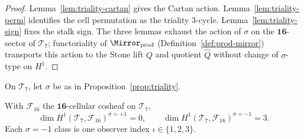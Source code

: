 \begin{proof}
Lemma~\ref{lem:triality-cartan} gives the Cartan action.
Lemma~\ref{lem:triality-perm} identifies the cell permutation as the triality
$3$-cycle. Lemma~\ref{lem:triality-sign} fixes the stalk sign.
The three lemmas exhaust the action of $\sigma$ on the
$\mathbf{16}$-sector of $\mathcal{T}_7$; functoriality of
$\Mirror_{\mathrm{prod}}$ (Definition~\ref{def:prod-mirror}) transports this
action to the Stone lift $Q$ and quotient $\hat Q$ without change of
$\sigma$-type on $H^1$.
\end{proof}

On $\mathcal{T}_7$, let $\sigma$ be as in Proposition~\ref{prop:triality}.

\begin{lemma}\label{lem:cellular}
With $\mathcal{F}_{16}$ the $\mathbf{16}$-cellular cosheaf on $\mathcal{T}_7$,
\begin{equation}\label{eq:cellular}
  \dim H^1(\mathcal{T}_7,\mathcal{F}_{16})^{\sigma=+1}=0,
  \qquad
  \dim H^1(\mathcal{T}_7,\mathcal{F}_{16})^{\sigma=-1}=3.
\end{equation}
Each $\sigma=-1$ class is one observer index $\iota\in\{1,2,3\}$.
\end{lemma}

